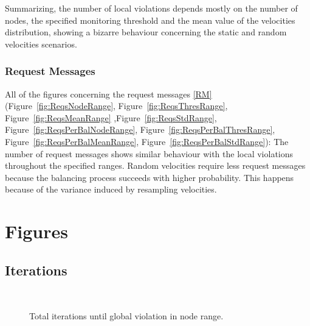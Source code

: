 \documentclass{article}
\begin{document}
			Summarizing, the number of local violations depends mostly on the number of nodes, the specified monitoring threshold and the mean value of the velocities distribution, showing a bizarre behaviour concerning the static and random velocities scenarios.
		\subsubsection{Request Messages}
		
			All of the figures concerning the request messages \ref{RM} (Figure~\ref{fig:ReqsNodeRange}, Figure~\ref{fig:ReqsThresRange}, Figure~\ref{fig:ReqsMeanRange} ,Figure~\ref{fig:ReqsStdRange}, Figure~\ref{fig:ReqsPerBalNodeRange}, Figure~\ref{fig:ReqsPerBalThresRange}, Figure~\ref{fig:ReqsPerBalMeanRange}, Figure~\ref{fig:ReqsPerBalStdRange}): The number of request messages shows similar behaviour with the local violations throughout the specified ranges. Random velocities require less request messages because the balancing process succeeds with higher probability. This happens because of the variance induced by resampling velocities.
		
		
		\newpage
		\appendix
		\section{Figures}
		\subsection{Iterations}

			\begin{figure}[H]
			\hspace*{-3.2cm}	\hfill
				\\ \hspace*{-3.2cm} \hfill
			
			\caption{Total iterations until global violation in node range.}
			\label{fig:TotalIterNodeRange}
			\end{figure}
			
\end{document}
